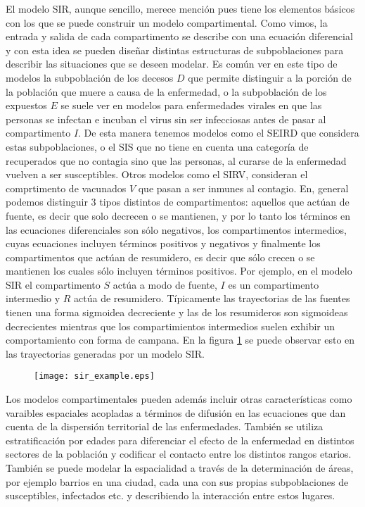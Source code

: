 El modelo SIR, aunque sencillo, merece mención pues tiene los elementos básicos con los que se puede construir un modelo compartimental. Como vimos, la entrada y salida de cada compartimento se describe con una ecuación diferencial y con esta idea se pueden diseñar distintas estructuras de subpoblaciones para describir las situaciones que se deseen modelar. Es común ver en este tipo de modelos la subpoblación de los decesos $D$ que permite distinguir a la porción de la población que muere a causa de la enfermedad, o la subpoblación de los expuestos $E$ se suele ver en modelos para enfermedades virales en que las personas se infectan e incuban el virus sin ser infecciosas antes de pasar al compartimento $I$. De esta manera tenemos modelos como el SEIRD que considera estas subpoblaciones, o el SIS que no tiene en cuenta una categoría de recuperados que no contagia sino que las personas, al curarse de la enfermedad vuelven a ser susceptibles. Otros modelos como el SIRV, consideran el comprtimento de vacunados $V$ que pasan a ser inmunes al contagio. En, general podemos distinguir 3 tipos distintos de compartimentos: aquellos que actúan de fuente, es decir que solo decrecen o se mantienen, y por lo tanto los términos en las ecuaciones diferenciales son sólo negativos, los compartimentos intermedios, cuyas ecuaciones incluyen términos positivos y negativos y finalmente los compartimentos que actúan de resumidero, es decir que sólo crecen o se mantienen los cuales sólo incluyen términos positivos. Por ejemplo, en el modelo SIR el compartimento $S$ actúa a modo de fuente, $I$ es un compartimento intermedio y $R$ actúa de resumidero. Típicamente las trayectorias de las fuentes tienen una forma sigmoidea decreciente y las de los resumideros son sigmoideas decrecientes mientras que los compartimientos intermedios suelen exhibir un comportamiento con forma de campana. En la figura \ref{fig:sir_example} se puede observar esto en las trayectorias generadas por un modelo SIR.

\begin{figure}[h]
    \centering
    \texttt{[image: sir\_example.eps]}
    \caption{}
    \label{fig:sir_example}
\end{figure}

Los modelos compartimentales pueden además incluir otras características como varaibles espaciales acopladas a términos de difusión en las ecuaciones que dan cuenta de la dispersión territorial de las enfermedades. También se utiliza estratificación por edades para diferenciar el efecto de la enfermedad en distintos sectores de la población y codificar el contacto entre los distintos rangos etarios. También se puede modelar la espacialidad a través de la determinación de áreas, por ejemplo barrios en una ciudad, cada una con sus propias subpoblaciones de susceptibles, infectados etc. y describiendo la interacción entre estos lugares.

